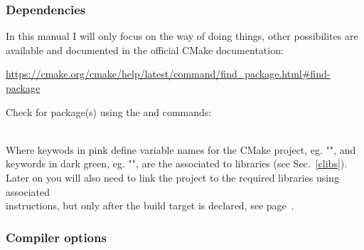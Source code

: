 \subsubsection*{Dependencies}
\label{cmake_deps}

In this manual I will only focus on the  way of doing things, other possibilites are available and documented in the official CMake documentation: 
\begin{center}\href{https://cmake.org/cmake/help/latest/command/find\_package.html\#find-package}{https://cmake.org/cmake/help/latest/command/find\_package.html\#find-package}\end{center}
Check for package(s) using the  and  commands: 
\begin{script}




\end{script}
\\[-0.25cm]
\noindent Where keywods in pink define variable names for the CMake project, eg. "\texttt{}", 
and keywords in dark green, eg. "", are the associated to  libraries (see Sec.~\ref{clibs}). \\ 
Later on you will also need to link the project to the required libraries using associated \\
 instructions, but only after the build target is declared, see page~\pageref{clink}.

\subsubsection*{Compiler options}

